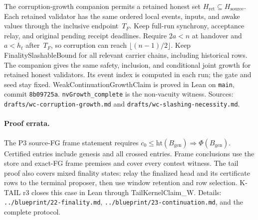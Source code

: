 \documentclass{article}
\newcommand{\genesis}{B_{\mathrm{gen}}}
\begin{document}
The corruption-growth companion permits a retained honest set
$H_{\mathrm{ret}}\subseteq H_{\mathrm{source}}$.  Each retained
validator has the same ordered local events, inputs, and awake values
through the inclusive endpoint~$T_F$.  Keep full-run synchrony,
acceptance relay, and original pending receipt deadlines.  Require
$2a<n$ at handover and $a<h_t$ after~$T_F$, so corruption can reach
$\lfloor(n-1)/2\rfloor$.  Keep \textsf{FinalitySlashableBound} for
all relevant carrier chains, including historical rows.  The companion
gives the same safety, inclusion, and conditional joint growth for
retained honest validators.  Its event index is computed in each run;
the gate and seed stay fixed.  \textsf{WeakContinuationGrowthClaim}
is proved in Lean on \texttt{main}, commit \texttt{8b09725a}.
\texttt{nvGrowth\_complete} is the non-vacuity witness.  Sources: \nolinkurl{drafts/wc-corruption-growth.md}
and \nolinkurl{drafts/wc-slashing-necessity.md}.

\paragraph{Proof errata.}
The P3 source-FG frame statement requires
$c_0\leq\mathrm{ht}(\genesis)\Rightarrow\Phi(\genesis)$.
Certified entries include genesis and all crossed entries.
Frame conclusions use the store and exact-FG frame premises and cover
every contest witness.  The tail proof also covers mixed finality
states: relay the finalized head and its certificate rows to the
terminal proposer, then use window retention and row selection.
K-TAIL r3 closes this case in Lean through \textsf{TailKernelClaim\_W}.
Details: \nolinkurl{../blueprint/22-finality.md},
\nolinkurl{../blueprint/23-continuation.md}, and the complete protocol.
\end{document}
